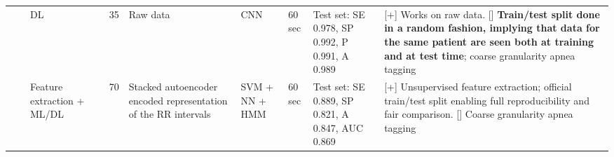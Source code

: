 \documentclass[5p,twocolumn,lefttitle]{elsarticle}
\begin{document}
\begin{table*}[!ht]
{\begin{tabularx}{2\textwidth}{@{}m{2.5em}p{7em}p{10em}lp{2em}p{12em}p{7em}p{3em}p{17em}X@{}}
                            &                                                         & DL                                                             & \cite{dey2018obstructive}                & 35            & Raw data                                                                                                          & CNN                                 & 60 sec                                     & Test set: SE 0.978, SP 0.992, P 0.991, A 0.989                                                                                                                                       & [+] Works on raw data. [] \textbf{Train/test split done in a random fashion, implying that data for the same patient are seen both at training and at test time}; coarse granularity apnea tagging                                                                                                                                                                                                                               \\
                            \cmidrule(l){3-10} 
                            &                                                         & Feature extraction + ML/DL                                     & \cite{li2018method}                      & 70            & Stacked autoencoder encoded representation of the RR intervals                                                    & SVM + NN + HMM                      & 60 sec                                     & Test set: SE 0.889, SP 0.821, A 0.847, AUC 0.869                                                                                                                                        & [+] Unsupervised feature extraction; official train/test split enabling full reproducibility and fair comparison. [] Coarse granularity apnea tagging                                                                                                                                                                                                                                                                 \\
                            \cmidrule(l){3-10} 

\end{tabularx}}
\end{table*}
\end{document}
